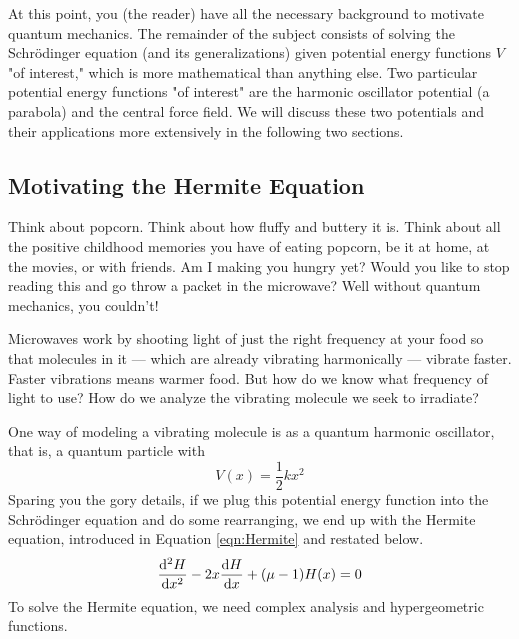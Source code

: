 \documentclass[titlepage]{article}
\numberwithin{equation}{section}
\begin{document}
At this point, you (the reader) have all the necessary background to motivate quantum mechanics. The remainder of the subject consists of solving the Schr\"{o}dinger equation (and its generalizations) given potential energy functions $V$ "of interest," which is more mathematical than anything else. Two particular potential energy functions "of interest" are the harmonic oscillator potential (a parabola) and the central force field. We will discuss these two potentials and their applications more extensively in the following two sections.


\subsection{Motivating the Hermite Equation}
Think about popcorn. Think about how fluffy and buttery it is. Think about all the positive childhood memories you have of eating popcorn, be it at home, at the movies, or with friends. Am I making you hungry yet? Would you like to stop reading this and go throw a packet in the microwave? Well without quantum mechanics, you couldn't!\par
Microwaves work by shooting light of just the right frequency at your food so that molecules in it --- which are already vibrating harmonically --- vibrate faster. Faster vibrations means warmer food. But how do we know what frequency of light to use? How do we analyze the vibrating molecule we seek to irradiate?\par
One way of modeling a vibrating molecule is as a quantum harmonic oscillator, that is, a quantum particle with
\begin{equation*}
    V(x) = \frac{1}{2}kx^2
\end{equation*}
Sparing you the gory details, if we plug this potential energy function into the Schr\"{o}dinger equation and do some rearranging, we end up with the Hermite equation, introduced in Equation \ref{eqn:Hermite} and restated below.
\begin{equation*}
    \dv[2]{H}{x}-2x\dv{H}{x}+(\mu-1)H(x) = 0
\end{equation*}
To solve the Hermite equation, we need complex analysis and hypergeometric functions.
\end{document}

